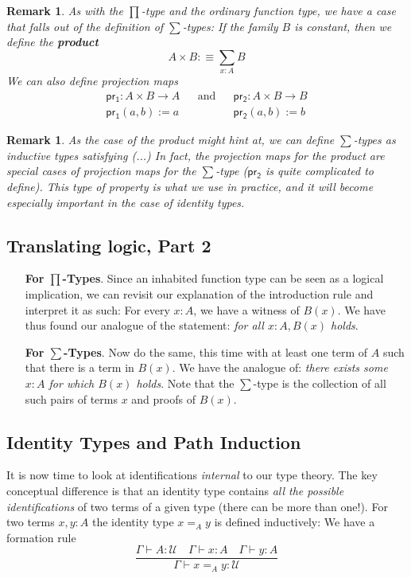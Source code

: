 \documentclass{scrartcl}
\newcommand{\textbi}[1]{\textbf{\textit{#1}}}
\newtheorem{rem}[subsection]{Remark}
\newcommand{\tcnote}[1]{\todo[color=orange!40,linecolor=green!40!black,size=\tiny]{#1}}
\begin{document}
\begin{itemize}
    \begin{rem}
        As with the $\prod$-type and the ordinary function type, we have a case that falls out of the definition of $\sum$-types: If the family $B$ is constant, then we define the \textbi{product} $$A\times B:\equiv \sum_{x:A}B$$
        We can also define projection maps \begin{align*}
            \mathsf{pr_1}: A\times B\to A &&\text{and}&& \mathsf{pr_2}: A\times B\to B \\
            \mathsf{pr_1}(a,b):=a && && \mathsf{pr_2}(a,b):=b
        \end{align*}
    \end{rem}

    \begin{rem}
        As the case of the product might hint at, we can define $\sum$-types as inductive types satisfying (...) \tcnote{outline the rules.} In fact, the projection maps for the product are special cases of projection maps for the $\sum$-type ($ \mathsf{pr_2}$ is quite complicated to define). This type of property is what we use in practice, and it will become especially important in the case of identity types.
    \end{rem}
    
\end{itemize}

\subsection*{Translating logic, Part 2}
\begin{itemize}
    \item[\textbf{For $\prod$-Types}.] Since an inhabited function type can be seen as a logical implication, we can revisit our explanation of the introduction rule and interpret it as such: For every $x:A$, we have a witness of $B(x).$ We have thus found our analogue of the statement: \textit{for all $x: A, B(x)$ holds}.    
    \item[\textbf{For $\sum$-Types}.] Now do the same, this time with at least one term of $A$ such that there is a term in $B(x)$. We have the analogue of: \textit{there exists some $x: A$ for which $B(x)$ holds}. Note that the $\sum$-type is the collection of all such pairs of terms $x$ and proofs of $B(x)$.  
\end{itemize} 

\subsection*{Identity Types and Path Induction}
It is now time to look at identifications \textit{internal} to our type theory. The key conceptual difference is that an identity type contains \textit{all the possible identifications} of two terms of a given type (there can be more than one!). For two terms $x,y:A$ the identity type $x=_Ay$ is defined inductively:
We have a formation rule 
$$\frac{\Gamma \vdash A : \mathcal{U} \quad \Gamma \vdash x:A \quad \Gamma \vdash y:A}{\Gamma \vdash x =_A y : \mathcal{U}}$$
\end{document}
